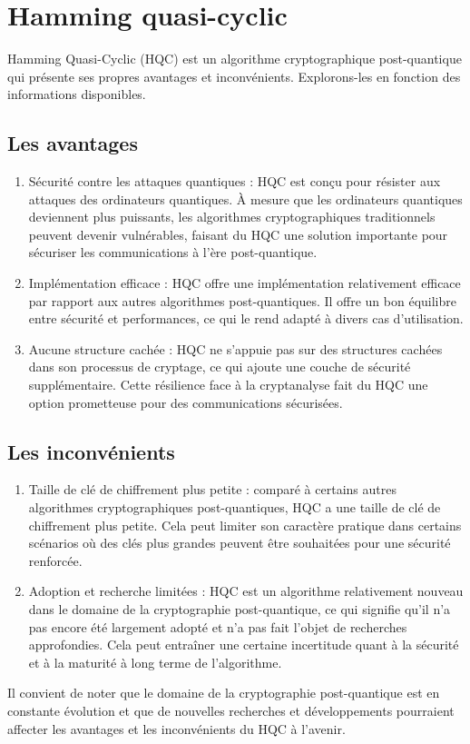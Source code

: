 \documentclass[12pt,openany]{report}
\begin{document}
\section{Hamming quasi-cyclic}

Hamming Quasi-Cyclic (HQC) est un algorithme cryptographique post-quantique qui présente ses propres avantages et inconvénients. Explorons-les en fonction des informations disponibles.
\subsection{Les avantages}
\begin{enumerate}
\item Sécurité contre les attaques quantiques : HQC est conçu pour résister aux attaques des ordinateurs quantiques. À mesure que les ordinateurs quantiques deviennent plus puissants, les algorithmes cryptographiques traditionnels peuvent devenir vulnérables, faisant du HQC une solution importante pour sécuriser les communications à l'ère post-quantique.
\item Implémentation efficace : HQC offre une implémentation relativement efficace par rapport aux autres algorithmes post-quantiques. Il offre un bon équilibre entre sécurité et performances, ce qui le rend adapté à divers cas d'utilisation.
\item Aucune structure cachée : HQC ne s'appuie pas sur des structures cachées dans son processus de cryptage, ce qui ajoute une couche de sécurité supplémentaire. Cette résilience face à la cryptanalyse fait du HQC une option prometteuse pour des communications sécurisées.

\end{enumerate}
\subsection{Les inconvénients}

\begin{enumerate}
\item Taille de clé de chiffrement plus petite : comparé à certains autres algorithmes cryptographiques post-quantiques, HQC a une taille de clé de chiffrement plus petite. Cela peut limiter son caractère pratique dans certains scénarios où des clés plus grandes peuvent être souhaitées pour une sécurité renforcée.
\item Adoption et recherche limitées : HQC est un algorithme relativement nouveau dans le domaine de la cryptographie post-quantique, ce qui signifie qu'il n'a pas encore été largement adopté et n'a pas fait l'objet de recherches approfondies. Cela peut entraîner une certaine incertitude quant à la sécurité et à la maturité à long terme de l'algorithme.
\end{enumerate}
Il convient de noter que le domaine de la cryptographie post-quantique est en constante évolution et que de nouvelles recherches et développements pourraient affecter les avantages et les inconvénients du HQC à l'avenir.\\
\end{document}
